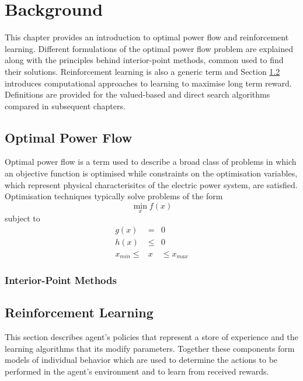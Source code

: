 \chapter{Background}
This chapter provides an introduction to optimal power flow and reinforcement
learning.  Different formulations of the optimal power flow problem are
explained along with the principles behind interior-point methods, common used
to find their solutions.  Reinforcement learning is also a generic term and
Section \ref{sec:rl} introduces computational approaches to learning to maximise
long term reward.  Definitions are provided for the valued-based and direct
search algorithms compared in subsequent chapters.

\section{Optimal Power Flow}
\label{sec:opf}
Optimal power flow is a term used to describe a broad class of problems in
which an objective function is optimised while constraints on the optimisation
variables, which represent physical characterisitcs of the electric power
system, are satisfied.  Optimisation techniques typically solve problems of the
form
\begin{equation}
\min_x f(x)
\end{equation}
subject to
\begin{eqnarray}
g(x)& =& 0\\
h(x)& \leq& 0\\
x_{min}\leq& x& \leq x_{max}
\end{eqnarray}

\subsection{Interior-Point Methods}

\section{Reinforcement Learning}
\label{sec:rl}
This section describes agent's policies that represent a store of experience
and the learning algorithms that its modify parameters. Together these
components form models of individual behavior which are used to determine the
actions to be performed in the agent's environment and to learn from received
rewards.

